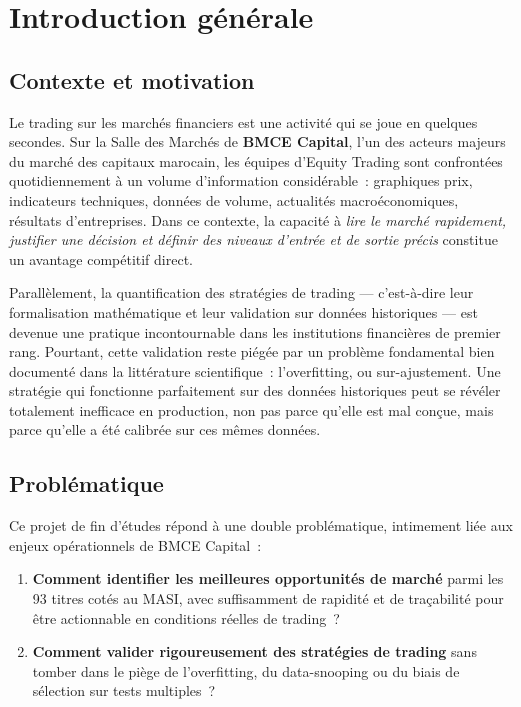 \chapter*{Introduction générale}

\section*{Contexte et motivation}

Le trading sur les marchés financiers est une activité qui se joue en quelques secondes.
Sur la Salle des Marchés de \textbf{BMCE Capital}, l'un des acteurs majeurs du marché
des capitaux marocain, les équipes d'Equity Trading sont confrontées quotidiennement à
un volume d'information considérable~: graphiques prix, indicateurs techniques, données
de volume, actualités macroéconomiques, résultats d'entreprises. Dans ce contexte,
la capacité à \emph{lire le marché rapidement, justifier une décision et définir des
niveaux d'entrée et de sortie précis} constitue un avantage compétitif direct.

\medskip

Parallèlement, la quantification des stratégies de trading — c'est-à-dire leur
formalisation mathématique et leur validation sur données historiques — est devenue
une pratique incontournable dans les institutions financières de premier rang. Pourtant,
cette validation reste piégée par un problème fondamental bien documenté dans la
littérature scientifique~: l'overfitting, ou sur-ajustement. Une stratégie qui
fonctionne parfaitement sur des données historiques peut se révéler totalement
inefficace en production, non pas parce qu'elle est mal conçue, mais parce qu'elle
a été \og calibrée \fg{} sur ces mêmes données.

\section*{Problématique}

Ce projet de fin d'études répond à une double problématique, intimement liée aux
enjeux opérationnels de BMCE Capital~:

\begin{enumerate}
    \item \textbf{Comment identifier les meilleures opportunités de marché} parmi les
    93 titres cotés au MASI, avec suffisamment de rapidité et de traçabilité pour être
    actionnable en conditions réelles de trading~?

    \item \textbf{Comment valider rigoureusement des stratégies de trading}
    sans tomber dans le piège de l'overfitting, du data-snooping ou du biais de
    sélection sur tests multiples~?
\end{enumerate}

